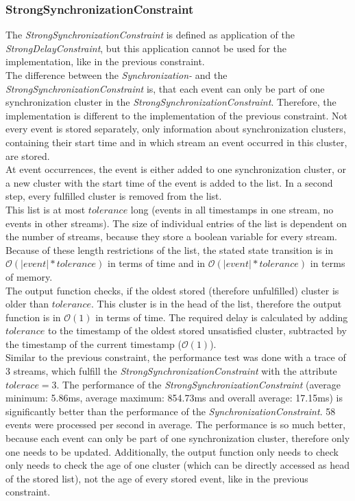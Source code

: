 \subsubsection{StrongSynchronizationConstraint}
	The \emph{StrongSynchronizationConstraint} is defined as application of the \emph{StrongDelayConstraint}, but this application cannot be used for the implementation, like in the previous constraint.\\
	The difference between the \emph{Synchronization-} and the \emph{StrongSynchronizationConstraint} is, that each event can only be part of one synchronization cluster in the \emph{StrongSynchronizationConstraint}. Therefore, the implementation is different to the implementation of the previous constraint. Not every event is stored separately, only information about synchronization clusters, containing their start time and in which stream an event occurred in this cluster, are stored.\\
	At event occurrences, the event is either added to one synchronization cluster, or a new cluster with the start time of the event is added to the list. In a second step, every fulfilled cluster is removed from the list.\\
	This list is at most $tolerance$ long (events in all timestamps in one stream, no events in other streams). The size of individual entries of the list is dependent on the number of streams, because they store a boolean variable for every stream. Because of these length restrictions of the list, the stated state transition is in $\mathcal{O}(|event|*tolerance)$ in terms of time and in $\mathcal{O}(|event|*tolerance)$ in terms of memory.\\
	The output function checks, if the oldest stored (therefore unfulfilled) cluster is older than $tolerance$. This cluster is in the head of the list, therefore the output function is in $\mathcal{O}(1)$ in terms of time. The required delay is calculated by adding $tolerance$ to the timestamp of the oldest stored unsatisfied cluster, subtracted by the timestamp of the current timestamp ($\mathcal{O}(1)$).\\
	Similar to the previous constraint, the performance test was done with a trace of 3 streams, which fulfill the \emph{StrongSynchronizationConstraint}  with the attribute $tolerace=3$.
	The performance of the \emph{StrongSynchronizationConstraint} (average minimum: 5.86ms, average maximum: 854.73ms and overall average: 17.15ms) is significantly better than the performance of the \emph{SynchronizationConstraint}. 58 events were processed per second in average. The performance is so much better, because each event can only be part of one synchronization cluster, therefore only one needs to be updated. Additionally, the output function only needs to check only needs to check the age of one cluster (which can be directly accessed as head of the stored list), not the age of every stored event, like in the previous constraint.

